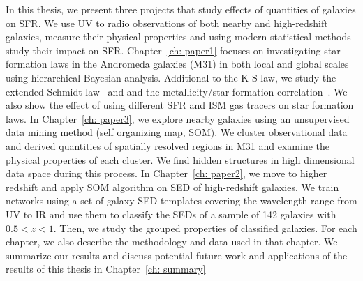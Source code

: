 In this thesis, we present three projects that study effects of quantities of galaxies on SFR.
We use UV to radio observations of both nearby and high-redshift galaxies, measure their physical properties and using modern statistical methods study their impact on SFR.
Chapter~\ref{ch: paper1} focuses on investigating star formation laws in the Andromeda galaxies (M31) in both local and global scales using hierarchical Bayesian analysis.
Additional to the K-S law, we study the extended Schmidt law~\citep{Shi11} and and the metallicity/star formation correlation~\citep{Krumholz09}.
We also show the effect of using different SFR and ISM gas tracers on star formation laws.
In Chapter~\ref{ch: paper3}, we explore nearby galaxies using an unsupervised data mining method (self organizing map, SOM).
We cluster observational data and derived quantities of spatially resolved regions in M31 and examine the physical properties of each cluster.
We find hidden structures in high dimensional data space during this process.
In Chapter~\ref{ch: paper2}, we move to higher redshift and apply SOM algorithm on SED of high-redshift galaxies.
We train networks using a set of galaxy SED templates covering the wavelength range from UV to IR and use them to classify the SEDs of a sample of 142 galaxies with $0.5 < z < 1$. 
Then, we study the grouped properties of classified galaxies.
For each chapter, we also describe the methodology and data used in that chapter.
We summarize our results and discuss potential future work and applications of the results of this thesis in Chapter~\ref{ch: summary}

 
